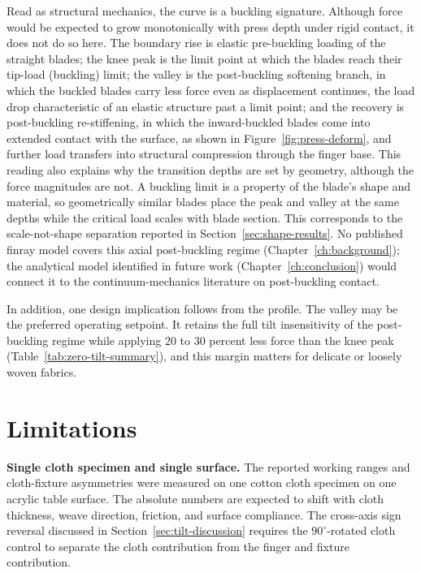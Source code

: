 Read as structural mechanics, the curve is a buckling signature.
Although force would be expected to grow monotonically with press depth
under rigid contact, it does not do so here.
The boundary rise is elastic pre-buckling
loading of the straight blades; the knee peak is the limit point at
which the blades reach their tip-load (buckling) limit; the valley is
the post-buckling softening branch, in which the buckled blades carry
less force even as displacement continues, the load drop
characteristic of an elastic structure past a limit point; and the
recovery is post-buckling re-stiffening, in which the inward-buckled
blades come into extended contact with the surface, as shown in
Figure~\ref{fig:press-deform}, and further load transfers into
structural compression through the finger base. This reading also
explains why the transition depths are set by geometry, although the
force magnitudes are not. A
buckling limit is a property of the blade's shape and material, so
geometrically similar blades place the peak and valley at the same
depths while the critical load scales with blade section. This
corresponds to the scale-not-shape separation reported in
Section~\ref{sec:shape-results}. No published finray model covers this
axial post-buckling regime (Chapter~\ref{ch:background}); the
analytical model identified in future work
(Chapter~\ref{ch:conclusion}) would connect it to the
continuum-mechanics literature on post-buckling contact.

In addition, one design implication follows from the profile. The
valley may be the preferred operating setpoint. It retains the full
tilt insensitivity of the post-buckling regime
while applying $20$ to $30$ percent less force than the knee peak
(Table~\ref{tab:zero-tilt-summary}), and this margin matters for
delicate or loosely woven fabrics.

\section{Limitations}
\label{sec:limitations}
\label{sec:deployment-envelope}

\textbf{Single cloth specimen and single surface.} The reported working
ranges and cloth-fixture asymmetries were measured on one cotton cloth
specimen on one acrylic table surface. The absolute numbers are expected
to shift with cloth thickness, weave direction, friction, and surface
compliance.
The cross-axis sign reversal discussed in
Section~\ref{sec:tilt-discussion} requires the $90^{\circ}$-rotated
cloth control to separate the cloth contribution from the finger and
fixture contribution.

